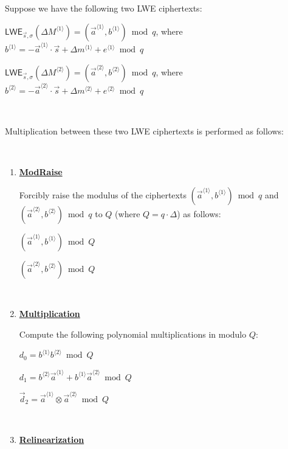 \begin{tcolorbox}[title={\textbf{\tboxlabel{\ref*{subsubsec:bfv-mult-cipher-summary}} TFHE's Ciphertext-to-Ciphertext Multiplication - Method 2}}]


Suppose we have the following two LWE ciphertexts:

$\textsf{LWE}_{\vec{s}, \sigma}(\Delta M^{\langle 1 \rangle}) = (\vec{a}^{\langle 1 \rangle}, b^{\langle 1 \rangle}) \bmod q$, \text{ } where $b^{\langle 1 \rangle} = -\vec{a}^{\langle 1 \rangle} \cdot \vec{s} + \Delta m^{\langle 1 \rangle} + e^{\langle 1 \rangle} \bmod q$

$\textsf{LWE}_{\vec{s}, \sigma}(\Delta M^{\langle 2 \rangle}) = (\vec{a}^{\langle 2 \rangle}, b^{\langle 2 \rangle}) \bmod q$, \text{ } where $b^{\langle 2 \rangle} = -\vec{a}^{\langle 2 \rangle} \cdot \vec{s} + \Delta m^{\langle 2 \rangle} + e^{\langle 2 \rangle} \bmod q$

$ $

Multiplication between these two LWE ciphertexts is performed as follows:

$ $

\begin{enumerate}

\item \textbf{\underline{\textsf{ModRaise}}}

Forcibly raise the modulus of the ciphertexts $(\vec{a}^{\langle 1 \rangle}, b^{\langle 1 \rangle}) \bmod q$ and $(\vec{a}^{\langle 2 \rangle}, b^{\langle 2 \rangle}) \bmod q$ to $Q$ (where $Q = q \cdot \Delta$) as follows:

$(\vec{a}^{\langle 1 \rangle}, b^{\langle 1 \rangle}) \bmod Q$

$(\vec{a}^{\langle 2 \rangle}, b^{\langle 2 \rangle}) \bmod Q$


$ $

\item \textbf{\underline{Multiplication}}

Compute the following polynomial multiplications in modulo $Q$: 

$d_0 = b^{\langle 1 \rangle}b^{\langle 2 \rangle} \bmod Q$

$d_1 = b^{\langle 2 \rangle}\vec{a}^{\langle 1 \rangle} +  b^{\langle 1 \rangle}\vec{a}^{\langle 2 \rangle} \bmod Q$

$\vec{d}_2 = \vec{a}^{\langle 1 \rangle} \otimes \vec{a}^{\langle 2 \rangle} \bmod Q$


$ $

\item \textbf{\underline{Relinearization}} 



\end{enumerate}
\end{tcolorbox}
